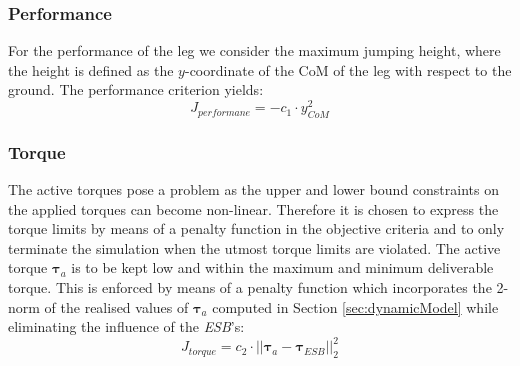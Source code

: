 \documentclass[letterpaper, 10 pt, conference]{ieeeconf}  %
\begin{document}
\subsubsection{Performance}
For the performance of the leg we consider the maximum jumping height, where the height is defined as the $y$-coordinate of the CoM of the leg with respect to the ground. The performance criterion yields:
 \begin{equation}
	J_{performane} = -c_1 \cdot y_{CoM}^2
 \end{equation}

\subsubsection{Torque}
The active torques pose a problem as the upper and lower bound constraints on the applied torques can become non-linear. Therefore it is chosen to express the torque limits by means of a penalty function in the objective criteria and to only terminate the simulation when the utmost torque limits are violated.
The active torque $\boldsymbol{\tau}_a$ is to be kept low and within the maximum and minimum deliverable torque. This is enforced by means of a penalty function which incorporates the 2-norm of the realised values of $\boldsymbol{\tau}_a$ computed in Section \ref{sec:dynamicModel} while eliminating the influence of the \textit{ESB}'s:  
 \begin{equation}
J_{torque}= c_2 \cdot || \boldsymbol{\tau}_a - \boldsymbol{\tau}_{ESB} ||_2^2
 \end{equation}
\end{document}
